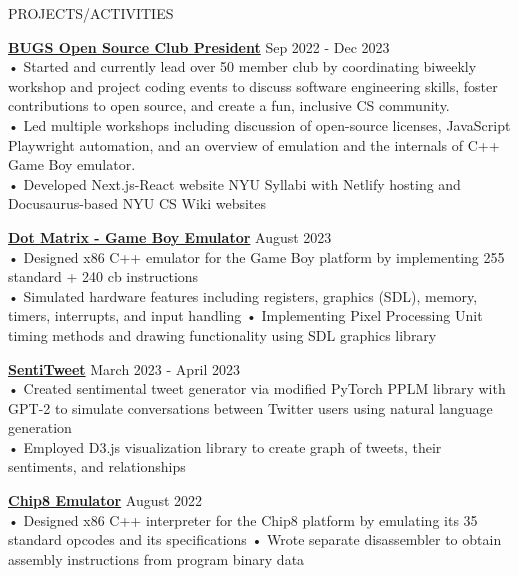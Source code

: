 \documentclass{resume} %
\begin{document}

\begin{rSection}{PROJECTS/ACTIVITIES}

\textbf{\href{https://bugs-nyu.github.io/}{BUGS Open Source Club President}} \hfill Sep 2022 - Dec 2023 \\
• Started and currently lead over 50 member club by coordinating biweekly workshop and project coding events to discuss software engineering skills, foster contributions to open source, and create a fun, inclusive CS community.\\
• Led multiple workshops including discussion of open-source licenses, JavaScript Playwright automation, and an overview of emulation and the internals of C++ Game Boy emulator.\\
• Developed Next.js-React website NYU Syllabi with Netlify hosting and Docusaurus-based NYU CS Wiki websites


\textbf{\href{https://github.com/aminoa/dot-matrix}{Dot Matrix - Game Boy Emulator}} \hfill August 2023 \\
• Designed x86 C++ emulator for the Game Boy platform by implementing 255 standard + 240 cb instructions \\
• Simulated hardware features including registers, graphics (SDL), memory, timers, interrupts, and input handling \newline
• Implementing Pixel Processing Unit timing methods and drawing functionality using SDL graphics library

\textbf {\href{https://github.com/aminoa/sentitweet/}{SentiTweet}} \hfill March 2023 - April 2023 \\
• Created sentimental tweet generator via modified PyTorch PPLM library with GPT-2 to simulate conversations between Twitter users using natural language generation\\
• Employed D3.js visualization library to create graph of tweets, their sentiments, and relationships 

\textbf{\href{https://github.com/aminoa/chip8}{Chip8 Emulator}} \hfill August 2022 \\
• Designed x86 C++ interpreter for the Chip8 platform by emulating its 35 standard opcodes and its specifications
• Wrote separate disassembler to obtain assembly instructions from program binary data

\end{rSection}
\end{document}
